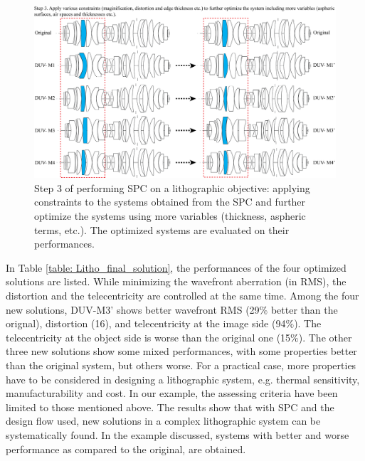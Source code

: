 \begin{figure}[h!]
    \centering
    \includegraphics[width=\textwidth]{chapter-4/figures/Litho_SPC_minima_listed.png}
    \caption{Step 3 of performing SPC on a lithographic objective: applying constraints to the systems obtained from the SPC and further optimize the systems using more variables (thickness, aspheric terms, etc.). The optimized systems are evaluated on their performances.}
    \label{fig: litho_Step3}
\end{figure}

In Table \ref{table: Litho_final_solution}, the performances of the four optimized solutions are listed. While minimizing the wavefront aberration (in RMS), the distortion and the telecentricity are controlled at the same time. Among the four new solutions, DUV-M3' shows better wavefront RMS (29$\%$ better than the orignal), distortion (16\text{\%}), and telecentricity at the image side (94$\%$). The telecentricity at the object side is worse than the original one (15$\%$). The other three new solutions show some mixed performances, with some properties better than the original system, but others worse. For a practical case, more properties have to be considered in designing a lithographic system, e.g. thermal sensitivity, manufacturability and cost. In our example, the assessing criteria have been limited to those mentioned above. The results show that with SPC and the design flow used, new solutions in a complex lithographic system can be systematically found. In the example discussed, systems with better and worse performance as compared to the original, are obtained. 

